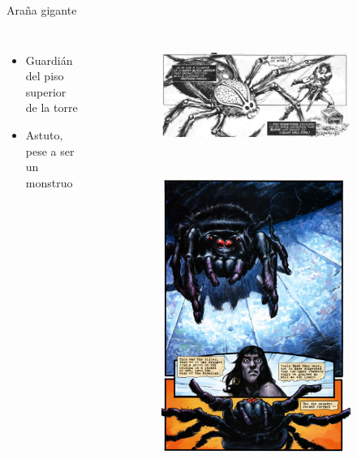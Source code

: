\begin{frame}{Araña gigante}
\begin{columns}
\begin{itemize}
 \item Guardián del piso superior de la torre
 \item Astuto, pese a ser un monstruo
\end{itemize}
\begin{figure}[htp]
 \centering
 \begin{subfigure}[b]{0.4\textwidth}
   \includegraphics[width=\textwidth]{img/arana/TSSC}
 \end{subfigure}
~
 \begin{subfigure}[b]{0.3\textwidth}
   \includegraphics[width=\textwidth]{img/arana/DH}

\end{subfigure}
\end{figure}
\end{columns}
\end{frame}

